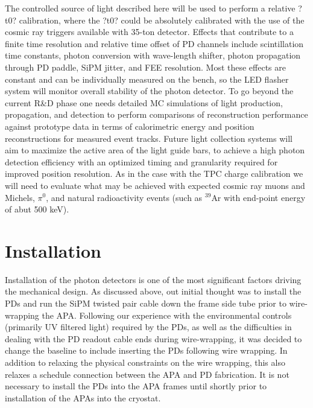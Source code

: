 The controlled source of light described here will be used to perform
a relative ?t0? calibration, where the ?t0? could be absolutely
calibrated with the use of the cosmic ray triggers available with
35-ton detector. Effects that contribute to a finite time resolution
and relative time offset of PD channels include scintillation time
constants, photon conversion with wave-length shifter, photon
propagation through PD paddle, SiPM jitter, and FEE resolution. Most
these effects are constant and can be individually measured on the
bench, so the LED flasher system will monitor overall stability of the
photon detector.  To go beyond the current R\&D phase one needs
detailed MC simulations of light production, propagation, and
detection to perform comparisons of reconstruction performance against
prototype data in terms of calorimetric energy and position
reconstructions for measured event tracks. Future light collection
systems will aim to maximize the active area of the light guide bars,
to achieve a high photon detection efficiency with an optimized timing
and granularity required for improved position resolution. As in the
case with the TPC charge calibration we will need to evaluate what may
be achieved with expected cosmic ray muons and Michels, $\pi^0$, and
natural radioactivity events (such as $^{39}$Ar with end-point energy
of abut 500 keV).

\section{Installation}

Installation of the photon detectors is one of the most significant
factors driving the mechanical design.  As discussed above, out
initial thought was to install the PDs and run the SiPM twisted pair
cable down the frame side tube prior to wire-wrapping the APA.
Following our experience with the environmental controls (primarily UV
filtered light) required by the PDs, as well as the difficulties in
dealing with the PD readout cable ends during wire-wrapping, it was
decided to change the baseline to include inserting the PDs following
wire wrapping.  In addition to relaxing the physical constraints on
the wire wrapping, this also relaxes a schedule connection between the
APA and PD fabrication.  It is not necessary to install the PDs into
the APA frames until shortly prior to installation of the APAs into
the cryostat.

